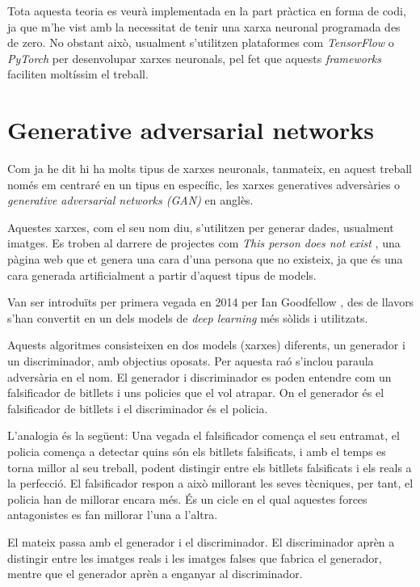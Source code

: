 Tota aquesta teoria es veurà implementada en la part pràctica en forma de codi, ja que m'he vist amb la necessitat de tenir una xarxa neuronal programada des de zero. No obstant això, usualment s'utilitzen plataformes com \textit{TensorFlow} \cite{tensorflow2015-whitepaper} o \textit{PyTorch} \cite{pytorch_2019} per desenvolupar xarxes neuronals, pel fet que aquests \textit{frameworks} faciliten moltíssim el treball. 

\section{Generative adversarial networks}
Com ja he dit hi ha molts tipus de xarxes neuronals, tanmateix, en aquest treball només em centraré en un tipus en específic, les xarxes generatives adversàries o \textit{generative adversarial networks (GAN)} en anglès.

Aquestes xarxes, com el seu nom diu, s'utilitzen per generar dades, usualment imatges. Es troben al darrere de projectes com \textit{This person does not exist} \cite{styleGAN, this_person_does_not_exist}, una pàgina web que et genera una cara d'una persona que no existeix, ja que és una cara generada artificialment a partir d'aquest tipus de models.

Van ser introduïts per primera vegada en 2014 per Ian Goodfellow \cite{GAN2014}, des de llavors s'han convertit en un dels models de \textit{deep learning} més sòlids i utilitzats.

Aquests algoritmes consisteixen en dos models (xarxes) diferents, un generador i un discriminador, amb objectius oposats. Per aquesta raó s'inclou paraula adversària en el nom. El generador i discriminador es poden entendre com un falsificador de bitllets i uns policies que el vol atrapar. On el generador és el falsificador de bitllets i el discriminador és el policia.

L'analogia és la següent: 
Una vegada el falsificador comença el seu entramat, el policia comença a detectar quins són els bitllets falsificats, i amb el temps es torna millor al seu treball, podent distingir entre els bitllets falsificats i els reals a la perfecció. El falsificador respon a això millorant les seves tècniques, per tant, el policia han de millorar encara més. És un cicle en el qual aquestes forces antagonistes es fan millorar l'una a l'altra.

El mateix passa amb el generador i el discriminador. El discriminador aprèn a distingir entre les imatges reals i les imatges falses que fabrica el generador, mentre que el generador aprèn a enganyar al discriminador. 

